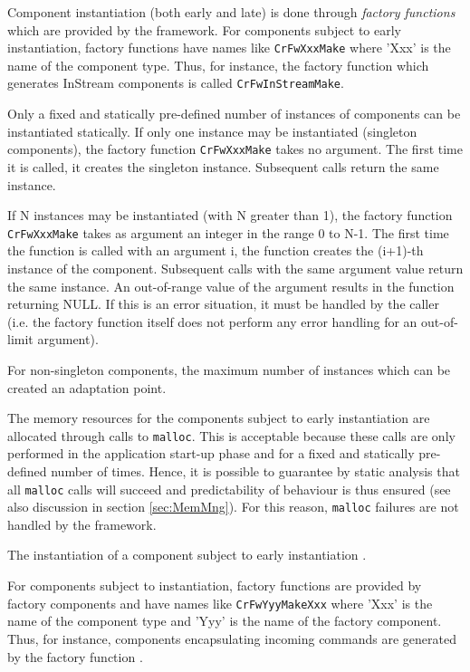 \documentclass{pnp_article}
\begin{document}
Component instantiation (both early and late) is done through \textit{factory functions} which are provided by the framework. For components subject to early instantiation, factory functions have names like \texttt{CrFwXxxMake} where 'Xxx' is the name of the component type. Thus, for instance, the factory function which generates InStream components is called \texttt{CrFwInStreamMake}.  

Only a fixed and statically pre-defined number of instances of components can be instantiated statically. If only one instance may be instantiated (singleton components), the factory function \texttt{CrFwXxxMake} takes no argument. The first time it is called, it creates the singleton instance. Subsequent calls return the same instance.

If N instances may be instantiated (with N greater than 1), the factory function \texttt{CrFwXxxMake} takes as argument an integer in the range 0 to N-1. The first time the function is called with an argument i, the function creates the (i+1)-th instance of the component. Subsequent calls with the same argument value return the same instance. An out-of-range value of the argument results in the function returning NULL. If this is an error situation, it must be handled by the caller (i.e. the factory function itself does not perform any error handling for an out-of-limit argument).

For non-singleton components, the maximum number of instances which can be created  an adaptation point.

The memory resources for the components subject to early instantiation are allocated through calls to \texttt{malloc}. This is acceptable because these calls are only performed in the application start-up phase and for a fixed and statically pre-defined number of times. Hence, it is possible to guarantee by static analysis that all \texttt{malloc} calls will succeed and predictability of behaviour is thus ensured (see also discussion in section \ref{sec:MemMng}). For this reason, \texttt{malloc} failures are not handled by the framework.

The instantiation of a component subject to early instantiation . 

For components subject to  instantiation, factory functions are provided by factory components and have names like \texttt{CrFwYyyMakeXxx} where 'Xxx' is the name of the component type and 'Yyy' is the name of the factory component. Thus, for instance, components encapsulating incoming commands are generated by the factory function .  
\end{document}
